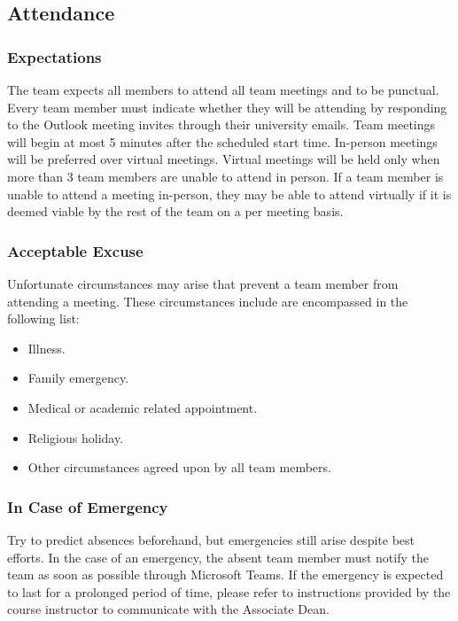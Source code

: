 \documentclass{article}
\begin{document}
\subsection*{Attendance}

\subsubsection*{Expectations}

The team expects all members to attend all team meetings and to be punctual. Every team member must indicate whether they will be attending 
by responding to the Outlook meeting invites through their university emails. Team meetings 
will begin at most 5 minutes after the scheduled start time. In-person meetings will be preferred over virtual meetings.
Virtual meetings will be held only when more than 3 team members are unable to attend in person. If a team member is unable to 
attend a meeting in-person, they may be able to attend virtually if it is deemed viable by the rest of the team on a per meeting basis.

\subsubsection*{Acceptable Excuse}

Unfortunate circumstances may arise that prevent a team member from attending a meeting.
These circumstances include are encompassed in the following list:
\begin{itemize}
  \item Illness.
  \item Family emergency.
  \item Medical or academic related appointment.
  \item Religious holiday.
  \item Other circumstances agreed upon by all team members.
\end{itemize}

\subsubsection*{In Case of Emergency}

Try to predict absences beforehand, but emergencies still arise despite best efforts.
In the case of an emergency, the absent team member must notify the team as soon as possible through Microsoft Teams.
If the emergency is expected to last for a prolonged period of time, please refer to instructions provided by the course instructor 
to communicate with the Associate Dean.
\end{document}
